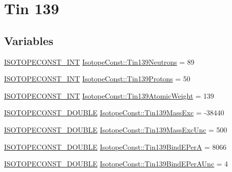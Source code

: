 \hypertarget{group___isotope_const-_tin-_sn139}{}\section{Tin 139}
\label{group___isotope_const-_tin-_sn139}
\subsection*{Variables}
\begin{DoxyCompactItemize}
\item 
\mbox{\hyperlink{group___isotope_const-_macros_ga5f18360b3e99483a35c32d789e62621c}{I\+S\+O\+T\+O\+P\+E\+C\+O\+N\+S\+T\+\_\+\+I\+NT}} \mbox{\hyperlink{group___isotope_const-_tin-_sn139_ga37e2f09bd33670cd802c818f29c542f6}{Isotope\+Const\+::\+Tin139\+Neutrons}} = 89
\item 
\mbox{\hyperlink{group___isotope_const-_macros_ga5f18360b3e99483a35c32d789e62621c}{I\+S\+O\+T\+O\+P\+E\+C\+O\+N\+S\+T\+\_\+\+I\+NT}} \mbox{\hyperlink{group___isotope_const-_tin-_sn139_ga8aed77912af1c4cadcb14d8893ddeae8}{Isotope\+Const\+::\+Tin139\+Protons}} = 50
\item 
\mbox{\hyperlink{group___isotope_const-_macros_ga5f18360b3e99483a35c32d789e62621c}{I\+S\+O\+T\+O\+P\+E\+C\+O\+N\+S\+T\+\_\+\+I\+NT}} \mbox{\hyperlink{group___isotope_const-_tin-_sn139_ga91357764030a6b008e5638433baf48c2}{Isotope\+Const\+::\+Tin139\+Atomic\+Weight}} = 139
\item 
\mbox{\hyperlink{group___isotope_const-_macros_ga8f45a7272ce02c0b4c65c44636ed719a}{I\+S\+O\+T\+O\+P\+E\+C\+O\+N\+S\+T\+\_\+\+D\+O\+U\+B\+LE}} \mbox{\hyperlink{group___isotope_const-_tin-_sn139_ga2e4576c4db48120c412981276730fb62}{Isotope\+Const\+::\+Tin139\+Mass\+Exc}} = -\/38440
\item 
\mbox{\hyperlink{group___isotope_const-_macros_ga8f45a7272ce02c0b4c65c44636ed719a}{I\+S\+O\+T\+O\+P\+E\+C\+O\+N\+S\+T\+\_\+\+D\+O\+U\+B\+LE}} \mbox{\hyperlink{group___isotope_const-_tin-_sn139_gad206a735a1633607de3214eacd5dea10}{Isotope\+Const\+::\+Tin139\+Mass\+Exc\+Unc}} = 500
\item 
\mbox{\hyperlink{group___isotope_const-_macros_ga8f45a7272ce02c0b4c65c44636ed719a}{I\+S\+O\+T\+O\+P\+E\+C\+O\+N\+S\+T\+\_\+\+D\+O\+U\+B\+LE}} \mbox{\hyperlink{group___isotope_const-_tin-_sn139_gaf1962e29465c41f6bb6b9d4ecc6b7aeb}{Isotope\+Const\+::\+Tin139\+Bind\+E\+PerA}} = 8066
\item 
\mbox{\hyperlink{group___isotope_const-_macros_ga8f45a7272ce02c0b4c65c44636ed719a}{I\+S\+O\+T\+O\+P\+E\+C\+O\+N\+S\+T\+\_\+\+D\+O\+U\+B\+LE}} \mbox{\hyperlink{group___isotope_const-_tin-_sn139_gacab7409b7090f810e69448f805a66443}{Isotope\+Const\+::\+Tin139\+Bind\+E\+Per\+A\+Unc}} = 4

\end{DoxyCompactItemize}
